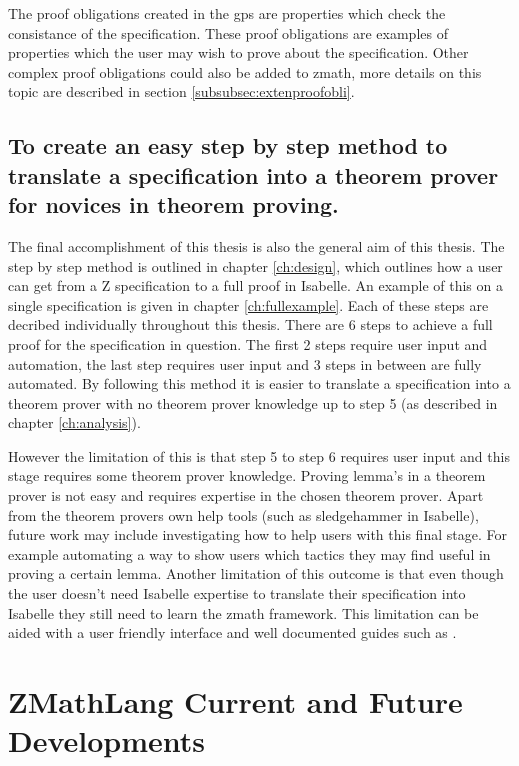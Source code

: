 The proof obligations created in the \gls{gps} are properties which check the
consistance of the specification. These proof obligations are examples of
properties which the user may wish to prove about the specification. Other
complex proof obligations could also be added to \gls{zmath}, more details on
this topic are described in section \ref{subsubsec:extenproofobli}.

\subsection{To create an easy step by step method to translate a specification into a theorem prover for novices in theorem proving.}

The final accomplishment of this thesis is also the general aim of this thesis.
The step by step method is outlined in chapter \ref{ch:design}, which outlines
how a user can get from a Z specification to a full proof in Isabelle. An
example of this on a single specification is given in chapter
\ref{ch:fullexample}. Each of these steps are decribed individually throughout
this thesis. There are 6 steps to achieve a full proof for the specification in
question. The first 2 steps require user input and automation, the last step
requires user input and 3 steps in between are fully automated. By following
this method it is easier to translate a specification into a theorem prover with
no theorem prover knowledge up to step 5 (as described in chapter
\ref{ch:analysis}).

However the limitation of this is that step 5 to step 6 requires user input and
this stage requires some theorem prover knowledge. Proving lemma's in a theorem
prover is not easy and requires expertise in the chosen theorem prover. Apart
from the theorem provers own help tools (such as sledgehammer in Isabelle),
future work may include investigating how to help users with this final stage.
For example automating a way to show users which tactics they may find useful in
proving a certain lemma. Another limitation of this outcome is that even though
the user doesn't need Isabelle expertise to translate their specification into
Isabelle they still need to learn the \gls{zmath} framework. This limitation can
be aided with a user friendly interface and well documented guides such as
\cite{zmathuser}.


\section{ZMathLang Current and Future Developments}
\label{sec:zmathcurandfut}

